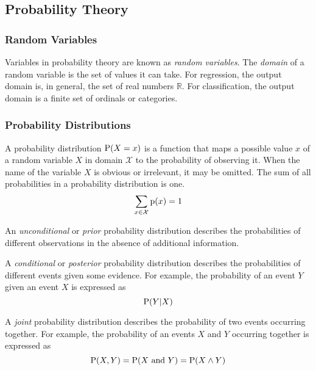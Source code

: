 \subsection{Probability Theory}

\subsubsection{Random Variables}

Variables in probability theory are known as \emph{random variables}.
The \emph{domain} of a random variable is the set of values it can take.
For regression, the output domain is, in general, the set of real numbers \( \mathbb{R} \)\@.
For classification, the output domain is a finite set of ordinals or categories.

\subsubsection{Probability Distributions}

A probability distribution \( \mathrm{P}\!\left( X = x \right) \) is a function that maps a possible value \( x \) of a random variable \( X \) in domain \( \mathcal{X} \) to the probability of observing it.
When the name of the variable \( X \) is obvious or irrelevant, it may be omitted.
The sum of all probabilities in a probability distribution is one.
\begin{equation*}
  \sum_{x \in \mathcal{X}} \mathrm{p}\!\left( x \right) = 1
\end{equation*}

An \emph{unconditional} or \emph{prior} probability distribution describes the probabilities of different observations in the absence of additional information.

A \emph{conditional} or \emph{posterior} probability distribution describes the probabilities of different events given some evidence.
For example, the probability of an event \( Y \) given an event \( X \) is expressed as
\begin{equation*}
  \mathrm{P}\!\left( Y \vert X \right)
\end{equation*}

A \emph{joint} probability distribution describes the probability of two events occurring together.
For example, the probability of an events \( X \) and \( Y \) occurring together is expressed as
\begin{equation*}
  \mathrm{P}\!\left( X, Y \right) = \mathrm{P}\!\left( X \text{ and } Y \right) = \mathrm{P}\!\left( X \land Y \right)
\end{equation*}

